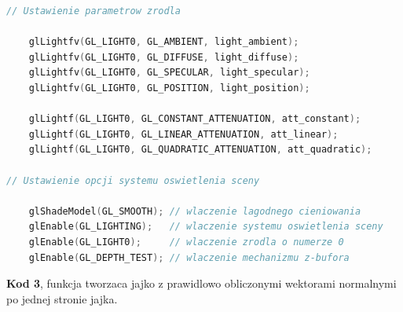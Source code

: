 \documentclass[polish,polish,a4paper]{article}
\begin{document}
{\begin{lstlisting}[language=C++]
// Ustawienie parametrow zrodla

    glLightfv(GL_LIGHT0, GL_AMBIENT, light_ambient);
    glLightfv(GL_LIGHT0, GL_DIFFUSE, light_diffuse);
    glLightfv(GL_LIGHT0, GL_SPECULAR, light_specular);
    glLightfv(GL_LIGHT0, GL_POSITION, light_position);

    glLightf(GL_LIGHT0, GL_CONSTANT_ATTENUATION, att_constant);
    glLightf(GL_LIGHT0, GL_LINEAR_ATTENUATION, att_linear);
    glLightf(GL_LIGHT0, GL_QUADRATIC_ATTENUATION, att_quadratic);

// Ustawienie opcji systemu oswietlenia sceny 

    glShadeModel(GL_SMOOTH); // wlaczenie lagodnego cieniowania
    glEnable(GL_LIGHTING);   // wlaczenie systemu oswietlenia sceny 
    glEnable(GL_LIGHT0);     // wlaczenie zrodla o numerze 0
    glEnable(GL_DEPTH_TEST); // wlaczenie mechanizmu z-bufora 

\end{lstlisting}
}
\textbf{Kod 3}, funkcja tworzaca jajko z prawidlowo obliczonymi wektorami normalnymi po jednej stronie jajka.   
\end{document}
